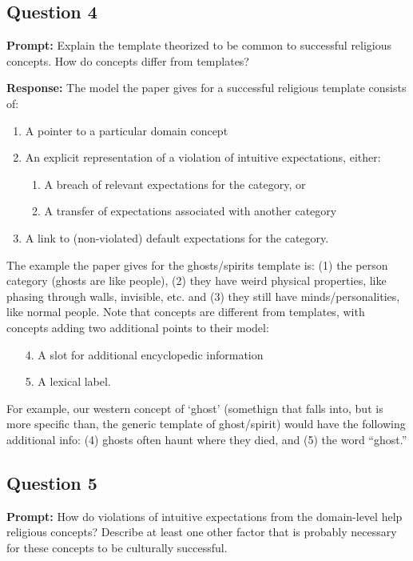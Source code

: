 \documentclass{article}
\begin{document}
\subsection*{Question 4}
\noindent\textbf{Prompt:} Explain the template theorized to be common to successful religious concepts. How do concepts differ from templates? 
\bigskip

\noindent\textbf{Response:} The model the paper gives for a successful religious template consists of:
\begin{enumerate}
    \item A pointer to a particular domain concept
    \item An explicit representation of a violation of intuitive expectations, either:
    \begin{enumerate}
        \item A breach of relevant expectations for the category, or
        \item A transfer of expectations associated with another category
    \end{enumerate}
    \item A link to (non-violated) default expectations for the category.
\end{enumerate} 

The example the paper gives for the ghosts/spirits template is: (1) the person category (ghosts are like people), (2) they have weird physical properties, like phasing through walls, invisible, etc. and (3) they still have minds/personalities, like normal people. Note that concepts are different from templates, with concepts adding two additional points to their model:
\begin{enumerate}
    \item[4.] A slot for additional encyclopedic information
    \item[5.] A lexical label.
\end{enumerate}

For example, our western concept of `ghost' (somethign that falls into, but is more specific than, the generic template of ghost/spirit) would have the following additional info: (4) ghosts often haunt where they died, and (5) the word ``ghost.''

\subsection*{Question 5}
\noindent\textbf{Prompt:} How do violations of intuitive expectations from the domain-level help religious concepts? Describe at least one other factor that is probably necessary for these concepts to be culturally successful.
\bigskip
\end{document}
